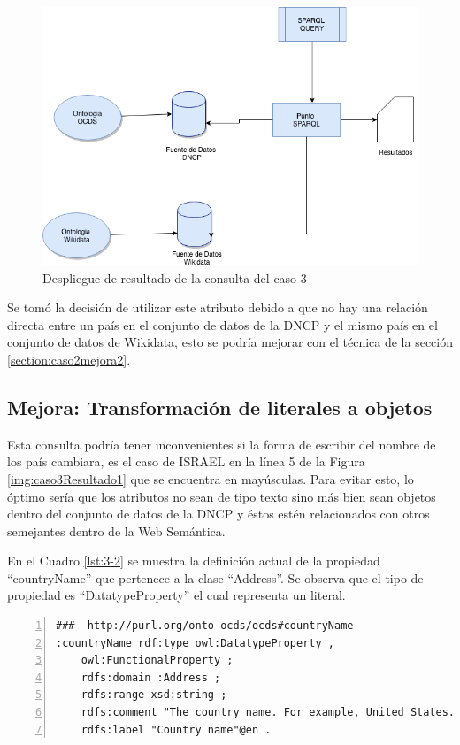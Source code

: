  \begin{figure}[ht!]
    \centering
    \includegraphics[width=150mm]{figuras/Diagramas-Caso3.png}
    \caption{Despliegue de resultado de la consulta del caso 3}
    \label{img:DiagramaCaso3}
 \end{figure}

Se tomó la decisión de utilizar este atributo debido a que no hay una relación directa entre un país en el conjunto de datos de la DNCP y el mismo país en el conjunto de datos de Wikidata, esto se podría mejorar con el técnica de la sección \ref{section:caso2mejora2}.

\subsection{Mejora: Transformación de literales a objetos}
Esta consulta podría tener inconvenientes si la forma de escribir del nombre de los país cambiara, es el caso de ISRAEL en la línea 5 de la Figura \ref{img:caso3Resultado1} que se encuentra en mayúsculas. Para evitar esto, lo óptimo sería que los atributos no sean de tipo texto sino más bien sean objetos dentro del conjunto de datos de la DNCP y éstos estén relacionados con otros semejantes dentro de la Web Semántica.

En el Cuadro \ref{lst:3-2} se muestra la definición actual de la propiedad “countryName” que pertenece a la clase “Address”. Se observa que el tipo de propiedad es “DatatypeProperty” el cual representa un literal.\hfill \break 

\noindent\begin{minipage}[c]{\textwidth}
\begin{lstlisting}[captionpos=b, caption=Definición de la propiedad countryName, label={lst:3-2},  numbers=left,  numberstyle=\tiny\color{mygray},frame=single]
###  http://purl.org/onto-ocds/ocds#countryName
:countryName rdf:type owl:DatatypeProperty ,
    owl:FunctionalProperty ;
    rdfs:domain :Address ;
    rdfs:range xsd:string ;
    rdfs:comment "The country name. For example, United States."@en ;
    rdfs:label "Country name"@en .
 \end{lstlisting}
\end{minipage}

